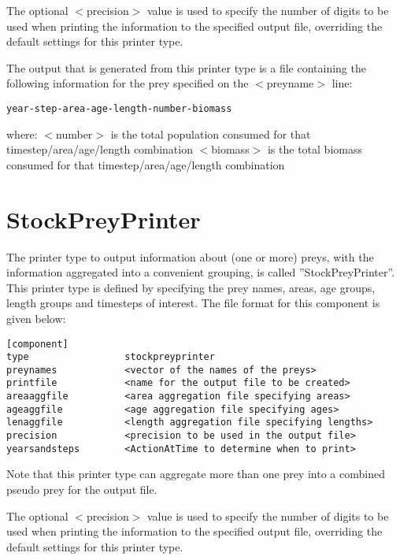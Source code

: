 \documentclass[10pt,twoside]{book}
\begin{document}
The optional $<$precision$>$ value is used to specify the number of digits to be used when printing the information to the specified output file, overriding the default settings for this printer type.

\bigskip
The output that is generated from this printer type is a file containing the following information for the prey specified on the $<$preyname$>$ line:

{\small\begin{verbatim}
year-step-area-age-length-number-biomass
\end{verbatim}}

where:\newline
$<$number$>$ is the total population consumed for that timestep/area/age/length combination\newline
$<$biomass$>$ is the total biomass consumed for that timestep/area/age/length combination

\section{StockPreyPrinter}\label{sec:stockpreyprinter}
The printer type to output information about (one or more) preys, with the information aggregated into a convenient grouping, is called ''StockPreyPrinter''.  This printer type is defined by specifying the prey names, areas, age groups, length groups and timesteps of interest.  The file format for this component is given below:

{\small\begin{verbatim}
[component]
type                 stockpreyprinter
preynames            <vector of the names of the preys>
printfile            <name for the output file to be created>
areaaggfile          <area aggregation file specifying areas>
ageaggfile           <age aggregation file specifying ages>
lenaggfile           <length aggregation file specifying lengths>
precision            <precision to be used in the output file>
yearsandsteps        <ActionAtTime to determine when to print>
\end{verbatim}}

Note that this printer type can aggregate more than one prey into a combined pseudo prey for the output file.

\bigskip
The optional $<$precision$>$ value is used to specify the number of digits to be used when printing the information to the specified output file, overriding the default settings for this printer type.
\end{document}
